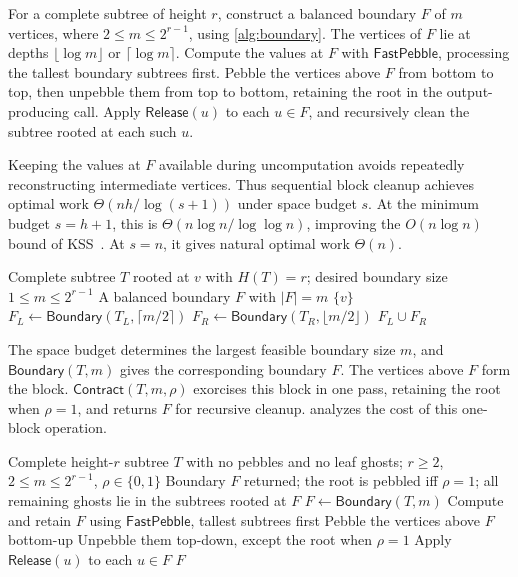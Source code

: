 \documentclass[11pt]{article}
\theoremstyle{definition}
\theoremstyle{remark}
\newcommand{\Fast}{\mathsf{FastPebble}}
\newcommand{\Release}{\mathsf{Release}}
\newcommand{\Contract}{\mathsf{Contract}}
\begin{document}
For a complete subtree of height $r$, construct a balanced boundary $F$ of $m$ vertices, where $2\le m\le2^{r-1}$, using \cref{alg:boundary}. The vertices of $F$ lie at depths $\lfloor\log m\rfloor$ or $\lceil\log m\rceil$. Compute the values at $F$ with $\Fast$, processing the tallest boundary subtrees first. Pebble the vertices above $F$ from bottom to top, then unpebble them from top to bottom, retaining the root in the output-producing call. Apply $\Release(u)$ to each $u\in F$, and recursively clean the subtree rooted at each such $u$.

Keeping the values at $F$ available during uncomputation avoids repeatedly reconstructing intermediate vertices. Thus sequential block cleanup achieves optimal work $\Theta(nh/\log(s+1))$ under space budget $s$. At the minimum budget $s=h+1$, this is $\Theta(n\log n/\log\log n)$, improving the $O(n\log n)$ bound of KSS~\cite{KSS2025}. At $s=n$, it gives natural optimal work $\Theta(n)$.

\begin{algorithm}[H]
\caption{Constructing a balanced boundary $\mathsf{Boundary}(T,m)$}
\label{alg:boundary}
\begin{algorithmic}[1]
\Require Complete subtree $T$ rooted at $v$ with $H(T)=r$;
         desired boundary size $1\le m\le2^{r-1}$
\Ensure A balanced boundary $F$ with $|F|=m$
 \State \Return $\{v\}$
\EndIf
\State $F_L\gets\mathsf{Boundary}(T_L,\lceil m/2\rceil)$
\State $F_R\gets\mathsf{Boundary}(T_R,\lfloor m/2\rfloor)$
\State \Return $F_L\cup F_R$
\end{algorithmic}
\end{algorithm}

The space budget determines the largest feasible boundary size $m$, and $\mathsf{Boundary}(T,m)$ gives the corresponding boundary $F$. The vertices above $F$ form the block. $\Contract(T,m,\rho)$ exorcises this block in one pass, retaining the root when $\rho=1$, and returns $F$ for recursive cleanup.  analyzes the cost of this one-block operation.


\begin{algorithm}[H]
\caption{One-block cleanup $\Contract(T,m,\rho)$}
\label{alg:block-contract}
\begin{algorithmic}[1]
\Require Complete height-$r$ subtree $T$ with no pebbles and no leaf ghosts;
         $r\ge2$, $2\le m\le2^{r-1}$, $\rho\in\{0,1\}$
\Ensure Boundary $F$ returned; the root is pebbled iff $\rho=1$;
        all remaining ghosts lie in the subtrees rooted at $F$
\State $F\gets\mathsf{Boundary}(T,m)$
\State Compute and retain $F$ using $\Fast$, tallest subtrees first
\State Pebble the vertices above $F$ bottom-up
\State Unpebble them top-down, except the root when $\rho=1$
\State Apply $\Release(u)$ to each $u\in F$
\State \Return $F$
\end{algorithmic}
\end{algorithm}
\end{document}
